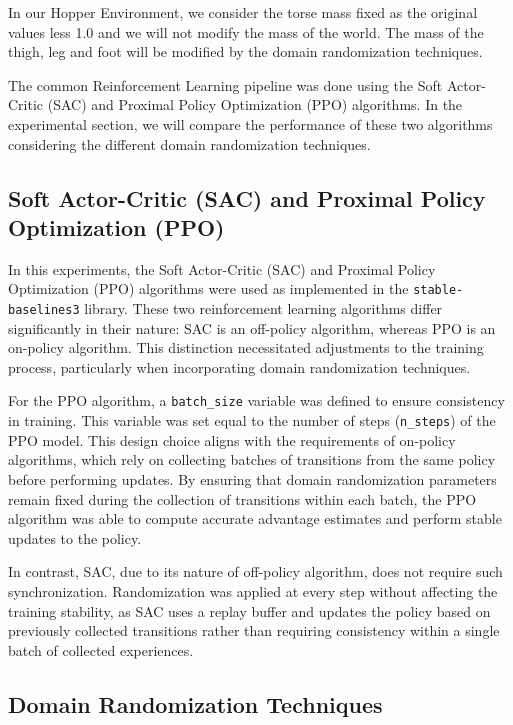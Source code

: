 \documentclass[12pt]{article}
\begin{document}
In our Hopper Environment, we consider the torse mass fixed as the original values less 1.0 and we will not modify the mass of the world. The mass of the thigh, leg and foot will be modified by the domain randomization techniques.

The common Reinforcement Learning pipeline was done using the Soft Actor-Critic (SAC) and Proximal Policy Optimization (PPO) algorithms. In the experimental section, we will compare the performance of these two algorithms considering the different domain randomization techniques.


\subsection{Soft Actor-Critic (SAC) and Proximal Policy Optimization (PPO)}

In this experiments, the Soft Actor-Critic (SAC) and Proximal Policy Optimization (PPO) algorithms were used as implemented in the \texttt{stable-baselines3} library. These two reinforcement learning algorithms differ significantly in their nature: SAC is an off-policy algorithm, whereas PPO is an on-policy algorithm. This distinction necessitated adjustments to the training process, particularly when incorporating domain randomization techniques.

For the PPO algorithm, a \texttt{batch\_size} variable was defined to ensure consistency in training. This variable was set equal to the number of steps (\texttt{n\_steps}) of the PPO model. This design choice aligns with the requirements of on-policy algorithms, which rely on collecting batches of transitions from the same policy before performing updates. By ensuring that domain randomization parameters remain fixed during the collection of transitions within each batch, the PPO algorithm was able to compute accurate advantage estimates and perform stable updates to the policy.

In contrast, SAC, due to its nature of off-policy algorithm, does not require such synchronization. Randomization was applied at every step without affecting the training stability, as SAC uses a replay buffer and updates the policy based on previously collected transitions rather than requiring consistency within a single batch of collected experiences.

\subsection{Domain Randomization Techniques}
\end{document}
